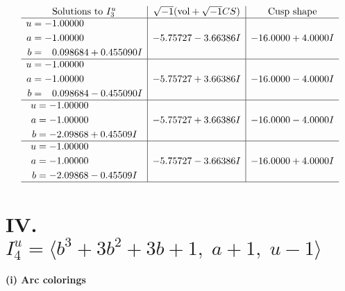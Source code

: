 \documentclass[1p]{elsarticle_modified}
\theoremstyle{definition}
\newcommand{\I}{\sqrt{-1}}
\begin{document}
$$\begin{array}{c|c|c}  
\text{Solutions to }I^u_{3}& \I (\text{vol} + \sqrt{-1}CS) & \text{Cusp shape}\\
 \hline 
\begin{aligned}
u &= -1.00000\phantom{ +0.000000I} \\
a &= -1.00000\phantom{ +0.000000I} \\
b &= \phantom{-}0.098684 + 0.455090 I\end{aligned}
 & -5.75727 - 3.66386 I & -16.0000 + 4.0000 I \\ \hline\begin{aligned}
u &= -1.00000\phantom{ +0.000000I} \\
a &= -1.00000\phantom{ +0.000000I} \\
b &= \phantom{-}0.098684 - 0.455090 I\end{aligned}
 & -5.75727 + 3.66386 I & -16.0000 - 4.0000 I \\ \hline\begin{aligned}
u &= -1.00000\phantom{ +0.000000I} \\
a &= -1.00000\phantom{ +0.000000I} \\
b &= -2.09868 + 0.45509 I\end{aligned}
 & -5.75727 + 3.66386 I & -16.0000 - 4.0000 I \\ \hline\begin{aligned}
u &= -1.00000\phantom{ +0.000000I} \\
a &= -1.00000\phantom{ +0.000000I} \\
b &= -2.09868 - 0.45509 I\end{aligned}
 & -5.75727 - 3.66386 I & -16.0000 + 4.0000 I\\
 \hline 
 \end{array}$$\newpage\newpage\renewcommand{\arraystretch}{1}
\centering \section*{IV. $I^u_{4}= \langle b^3+3 b^2+3 b+1,\;a+1,\;u-1 \rangle$}
\flushleft \textbf{(i) Arc colorings}\\
\end{document}
